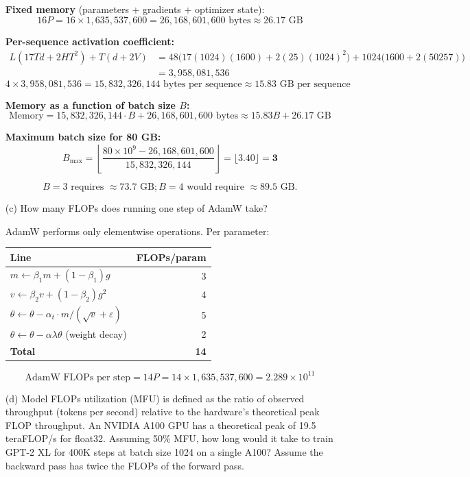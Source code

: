 \documentclass[letterpaper]{article}
\begin{document}
\begin{itemize}
	\textbf{Fixed memory} (parameters + gradients + optimizer state):
	\[
		16P = 16 \times 1{,}635{,}537{,}600 = 26{,}168{,}601{,}600 \text{ bytes} \approx 26.17\text{ GB}
	\]

	\textbf{Per-sequence activation coefficient:}
	\begin{align*}
		L(17Td + 2HT^2) + T(d + 2V)
		&= 48\bigl(17(1024)(1600) + 2(25)(1024)^2\bigr) + 1024\bigl(1600 + 2(50257)\bigr) \\
		&= 3{,}958{,}081{,}536
	\end{align*}
	\[
		4 \times 3{,}958{,}081{,}536 = 15{,}832{,}326{,}144 \text{ bytes per sequence} \approx 15.83\text{ GB per sequence}
	\]

	\textbf{Memory as a function of batch size $B$:}
	\[
		\text{Memory} = 15{,}832{,}326{,}144 \cdot B + 26{,}168{,}601{,}600 \text{ bytes} \approx 15.83B + 26.17\text{ GB}
	\]

	\textbf{Maximum batch size for 80 GB:}
	\[
		B_{\max} = \left\lfloor \frac{80 \times 10^9 - 26{,}168{,}601{,}600}{15{,}832{,}326{,}144} \right\rfloor = \lfloor 3.40 \rfloor = \mathbf{3}
	\]

	\[
		B=3 \text{ requires } \approx 73.7 \text{ GB}; B=4 \text{ would require } \approx 89.5 \text{ GB}.
	\]

	\item[(c)] How many FLOPs does running one step of AdamW take?

	AdamW performs only elementwise operations. Per parameter:

	\begin{center}
	\begin{tabular}{lr}
	\hline
	\textbf{Line} & \textbf{FLOPs/param} \\
	\hline
	$m \leftarrow \beta_1 m + (1-\beta_1)g$ & 3 \\
	$v \leftarrow \beta_2 v + (1-\beta_2)g^2$ & 4 \\
	$\theta \leftarrow \theta - \alpha_t \cdot m / (\sqrt{v} + \varepsilon)$ & 5 \\
	$\theta \leftarrow \theta - \alpha\lambda\theta$ (weight decay) & 2 \\
	\hline
	\textbf{Total} & \textbf{14} \\
	\hline
	\end{tabular}
	\end{center}

	\[
		\text{AdamW FLOPs per step} = 14P = 14 \times 1{,}635{,}537{,}600 = 2.289 \times 10^{11}
	\]

	\item[(d)] Model FLOPs utilization (MFU) is defined as the ratio of observed throughput (tokens per	second) relative to the hardware's theoretical peak FLOP throughput. An NVIDIA A100 GPU has a theoretical peak of 19.5 teraFLOP/s for float32. Assuming 50\% MFU, how long would it take to train GPT-2 XL for 400K steps at batch size 1024 on a single A100? Assume the backward pass has twice the FLOPs of the forward pass.


\end{itemize}
\end{document}
